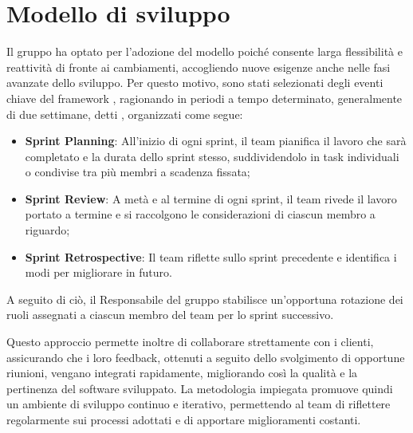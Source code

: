 \section{Modello di sviluppo}
\label{sec:modello_sviluppo}

Il gruppo ha optato per l'adozione del modello  poiché consente larga flessibilità e reattività di fronte ai cambiamenti, accogliendo nuove esigenze anche nelle fasi avanzate dello sviluppo. Per questo motivo, sono stati selezionati degli eventi chiave del framework , ragionando in periodi a tempo determinato, generalmente di due settimane, detti , organizzati come segue:
\begin{itemize}
    \item \textbf{Sprint Planning}: All'inizio di ogni sprint, il team pianifica il lavoro che sarà completato e la durata dello  sprint stesso, suddividendolo in task individuali o condivise tra più membri a scadenza fissata;
    \item \textbf{Sprint Review}: A metà e al termine di ogni sprint, il team rivede il lavoro portato a termine e si raccolgono le considerazioni di ciascun membro a riguardo;
    \item \textbf{Sprint Retrospective}: Il team riflette sullo sprint precedente e identifica i modi per migliorare in futuro.
\end{itemize}
A seguito di ciò, il Responsabile del gruppo stabilisce un'opportuna rotazione dei ruoli assegnati a ciascun membro del team per lo sprint successivo.

Questo approccio permette inoltre di collaborare strettamente con i clienti, assicurando che i loro feedback, ottenuti a seguito dello svolgimento di opportune riunioni, vengano integrati rapidamente, migliorando così la qualità e la pertinenza del software sviluppato. 
La metodologia impiegata promuove quindi un ambiente di sviluppo continuo e iterativo, permettendo al team di riflettere regolarmente sui processi adottati e di apportare miglioramenti costanti.